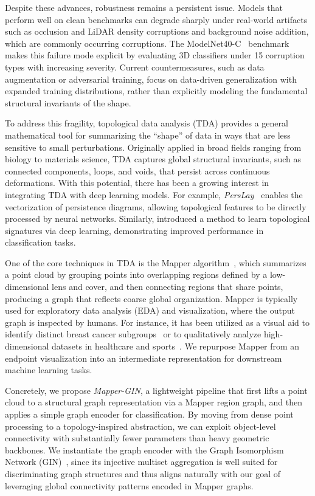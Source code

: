 \documentclass{article}
\begin{document}
Despite these advances, robustness remains a persistent issue. Models that perform well on clean benchmarks can degrade sharply under real-world artifacts such as occlusion and LiDAR density corruptions and background noise addition, which are commonly occurring corruptions. The ModelNet40-C~\cite{modelnetbench2022} benchmark makes this failure mode explicit by evaluating 3D classifiers under 15 corruption types with increasing severity. Current countermeasures, such as data augmentation or adversarial training, focus on data-driven generalization with expanded training distributions, rather than explicitly modeling the fundamental structural invariants of the shape.

To address this fragility, topological data analysis (TDA) provides a general mathematical tool for summarizing the ``shape'' of data in ways that are less sensitive to small perturbations. Originally applied in broad fields ranging from biology to materials science, TDA captures global structural invariants, such as connected components, loops, and voids, that persist across continuous deformations. With this potential, there has been a growing interest in integrating TDA with deep learning models. 
For example, \textit{PersLay}~\cite{carriere2018perslay} enables the vectorization of persistence diagrams, allowing topological features to be directly processed by neural networks. Similarly, \citet{hofer2017deep} introduced a method to learn topological signatures via deep learning, demonstrating improved performance in classification tasks.

One of the core techniques in TDA is the Mapper algorithm~\cite{mapper2007}, which summarizes a point cloud by grouping points into overlapping regions defined by a low-dimensional lens and cover, and then connecting regions that share points, producing a graph that reflects coarse global organization. Mapper is typically used for exploratory data analysis (EDA) and visualization, where the output graph is inspected by humans. For instance, it has been utilized as a visual aid to identify distinct breast cancer subgroups~\cite{nicolau2011topology} or to qualitatively analyze high-dimensional datasets in healthcare and sports~\cite{lum2013extracting}. We repurpose Mapper from an endpoint visualization into an intermediate representation for downstream machine learning tasks.

Concretely, we propose \emph{Mapper-GIN}, a lightweight pipeline that first lifts a point cloud to a structural graph representation via a Mapper region graph, and then applies a simple graph encoder for classification. By moving from dense point processing to a topology-inspired abstraction, we can exploit object-level connectivity with substantially fewer parameters than heavy geometric backbones. We instantiate the graph encoder with the Graph Isomorphism Network (GIN)~\cite{gin2019}, since its injective multiset aggregation is well suited for discriminating graph structures and thus aligns naturally with our goal of leveraging global connectivity patterns encoded in Mapper graphs.
\end{document}
